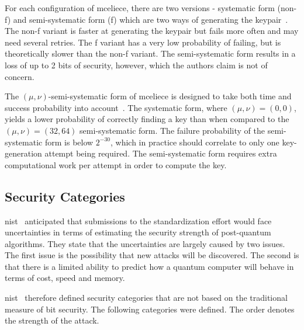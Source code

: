 For each configuration of \gls{mceliece}, there are two versions - systematic form (non-f) and semi-systematic form (f) which are two ways of generating the keypair~\cite{mceliece2020}. The non-f variant is faster at generating the keypair but fails more often and may need several retries. The f variant has a very low probability of failing, but is theoretically slower than the non-f variant. The semi-systematic form results in a loss of up to 2 bits of security, however, which the authors claim is not of concern.

The $(\mu, \nu)$-semi-systematic form of \gls{mceliece} is designed to take both time and success probability into account~\cite{mceliece2020}. The systematic form, where $(\mu, \nu)=(0, 0)$, yields a lower probability of correctly finding a key than when compared to the $(\mu, \nu)=(32,64)$ semi-systematic form. The failure probability of the semi-systematic form is below $2^{-30}$, which in practice should correlate to only one key-generation attempt being required. The semi-systematic form requires extra computational work per attempt in order to compute the key.

\subsection{Security Categories}
\label{section:background:security-categories}

\gls{nist}~\cite{nist2017} anticipated that submissions to the standardization effort would face uncertainties in terms of estimating the security strength of \gls{post-quantum} algorithms. They state that the uncertainties are largely caused by two issues. The first issue is the possibility that new attacks will be discovered. The second is that there is a limited ability to predict how a quantum computer will behave in terms of cost, speed and memory.

\gls{nist}~\cite{nist2017} therefore defined security categories that are not based on the traditional measure of bit security. The following categories were defined. The order denotes the strength of the attack.

